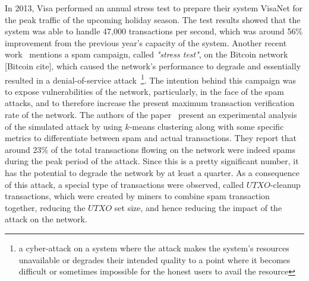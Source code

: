 In 2013, Visa performed an annual stress test to prepare their system VisaNet for the peak traffic of the upcoming holiday season. The test results showed that the system was able to handle 47,000 transactions per second, which was around 56\% improvement from the previous year's capacity of the system. %
Another recent work~\cite{baqer2016stressing} mentions a spam campaign, called \textit{"stress test"}, on the Bitcoin network [Bitcoin cite], which caused the network's performance to degrade and essentially resulted in a denial-of-service attack~\footnote{a cyber-attack on a system where the attack makes the system's resources unavailable or degrades their intended quality to a point where it becomes difficult or sometimes impossible for the honest users to avail the resource}. The intention behind this campaign was to expose vulnerabilities of the network, particularly, in the face of the spam attacks, and to therefore increase the present maximum transaction verification rate of the network. The authors of the paper~\cite{baqer2016stressing} present an experimental analysis of the simulated attack by using $k$-means clustering along with some specific metrics to differentiate between spam and actual transactions. They report that around 23\% of the total transactions flowing on the network were indeed spams during the peak period of the attack. Since this is a pretty significant number, it has the potential to degrade the network by at least a quarter. As a consequence of this attack, a special type of transactions were observed, called $UTXO$-cleanup transactions, which were created by miners to combine spam transaction together, reducing the $UTXO$ set size, and hence reducing the impact of the attack on the network.

